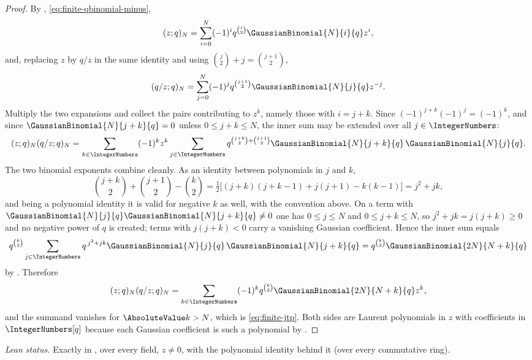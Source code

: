\documentclass[11pt,a4paper,oneside,openany]{book}
\theoremstyle{definition}
\theoremstyle{remark}
\begin{document}
\begin{proof}
By , \eqref{eq:finite-qbinomial-minus},
\[
 (z;q)_N=\sum_{i=0}^{N}(-1)^iq^{\binom i2}\GaussianBinomial{N}{i}{q} z^{i},
\]
and, replacing $z$ by $q/z$ in the same identity and using $\binom j2+j=\binom{j+1}{2}$,
\[
 (q/z;q)_N=\sum_{j=0}^{N}(-1)^jq^{\binom{j+1}{2}}\GaussianBinomial{N}{j}{q} z^{-j}.
\]
Multiply the two expansions and collect the pairs contributing to $z^{k}$, namely those with $i=j+k$.  Since $(-1)^{j+k}(-1)^{j}=(-1)^k$, and since $\GaussianBinomial{N}{j+k}{q}=0$ unless $0\le j+k\le N$, the inner sum may be extended over all $j\in\IntegerNumbers$:
\[
 (z;q)_N(q/z;q)_N
 =\sum_{k\in\IntegerNumbers}(-1)^kz^{k}
 \sum_{j\in\IntegerNumbers}q^{\binom{j+k}{2}+\binom{j+1}{2}}
 \GaussianBinomial{N}{j+k}{q}\,\GaussianBinomial{N}{j}{q} .
\]
The two binomial exponents combine cleanly.  As an identity between polynomials in $j$ and $k$,
\[
 \binom{j+k}{2}+\binom{j+1}{2}-\binom k2
 =\tfrac12\bigl[(j+k)(j+k-1)+j(j+1)-k(k-1)\bigr]
 =j^2+jk,
\]
and being a polynomial identity it is valid for negative $k$ as well, with the convention above.  On a term with $\GaussianBinomial{N}{j}{q}\GaussianBinomial{N}{j+k}{q}\ne0$ one has $0\le j\le N$ and $0\le j+k\le N$, so $j^2+jk=j(j+k)\ge0$ and no negative power of $q$ is created; terms with $j(j+k)<0$ carry a vanishing Gaussian coefficient.  Hence the inner sum equals
\[
 q^{\binom k2}\sum_{j\in\IntegerNumbers}q^{\,j^2+jk}
 \GaussianBinomial{N}{j}{q}\,\GaussianBinomial{N}{j+k}{q}
 =q^{\binom k2}\GaussianBinomial{2N}{N+k}{q}
\]
by .  Therefore
\[
 (z;q)_N(q/z;q)_N
 =\sum_{k\in\IntegerNumbers}(-1)^kq^{\binom k2}\GaussianBinomial{2N}{N+k}{q}z^{k},
\]
and the summand vanishes for $\AbsoluteValue k>N$, which is \eqref{eq:finite-jtp}.  Both sides are Laurent polynomials in $z$ with coefficients in $\IntegerNumbers[q]$ because each Gaussian coefficient is such a polynomial by .
\end{proof}

\emph{Lean status.}  Exactly  in
, over every field, $z\ne0$, with the polynomial identity
behind it  (over every commutative ring).
\end{document}
